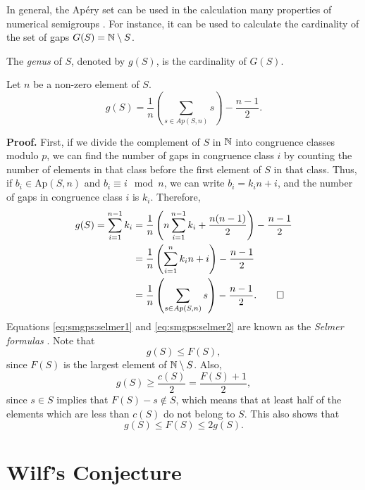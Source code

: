 In general, the Apéry set can be used in the calculation many properties of numerical semigroups \cite{apery1946branches}. For instance, it can be used to calculate the cardinality of the set of gaps $G(S) = \mathbb{N} \setminus S$.

\begin{definition}\label{def:smgps:genus}
    The \textit{genus} of $S$, denoted by $g(S)$, is the cardinality of $G(S)$.
\end{definition}

\begin{proposition} Let $n$ be a non-zero element of $S$. 
    \begin{equation}\label{eq:smgps:selmer2}
        g(S) = \frac{1}{n}\left(\sum_{s \in Ap(S, n)} s\right) - \frac{n - 1}{2}.
    \end{equation}
\end{proposition}
\textbf{Proof. } First, if we divide the complement of $S$ in $\mathbb{N}$ into congruence classes modulo $p$, we can find the number of gaps in congruence class $i$ by counting the number of elements in that class before the first element of $S$ in that class. Thus, if $b_i \in \text{Ap}(S, n)$ and $b_i \equiv i \mod n$, we can write $b_i = k_i n + i$, and the number of gaps in congruence class $i$ is $k_i$. Therefore,
\begin{align*}
    g(S) = \sum_{i = 1}^{n - 1} k_i &=  \frac{1}{n}\left(n\sum_{i = 1}^{n - 1} k_i + \frac{n(n - 1)}{2}\right) - \frac{n - 1}{2} \\
    &= \frac{1}{n}\left(\sum_{i = 1}^n k_i n + i \right) - \frac{n - 1}{2} \\
    &= \frac{1}{n}\left(\sum_{s \in Ap(S, n)} s \right) - \frac{n - 1}{2}. \qed
\end{align*}
Equations \ref{eq:smgps:selmer1} and \ref{eq:smgps:selmer2} are known as the \textit{Selmer formulas} \cite{selmer1977linear}. Note that \[g(S) \leq F(S),\] since $F(S)$ is the largest element of $\mathbb{N} \setminus S$. Also, 
\[g(S) \geq \frac{c(S)}{2} = \frac{F(S) + 1}{2},\]
since $s \in S$ implies that $F(S) - s \notin S$, which means that at least half of the elements which are less than $c(S)$ do not belong to $S$.  This also shows that
\begin{equation}\label{eq:smgps:frobgenus}
    g(S) \leq F(S) \leq 2g(S).
\end{equation}

\section{Wilf's Conjecture}\label{sec:smgps:theme2}

